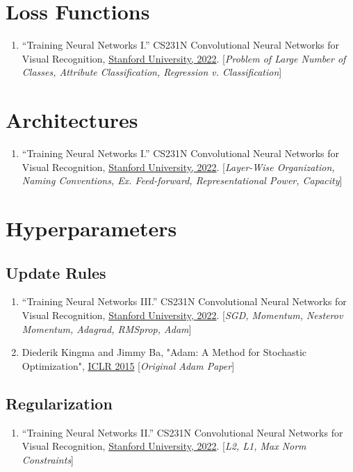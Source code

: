\documentclass[12pt]{article}
\begin{document}
\section{Loss Functions}
\begin{enumerate}
    \item “Training Neural Networks I.” 
    CS231N Convolutional Neural Networks for Visual Recognition, 
    \href{https://cs231n.github.io/neural-networks-2/#losses}{Stanford University, 2022}.
    [\emph{Problem of Large Number of Classes, Attribute Classification, 
    Regression v. Classification}]
\end{enumerate}

\section{Architectures}
\begin{enumerate}
    \item “Training Neural Networks I.” 
    CS231N Convolutional Neural Networks for Visual Recognition, 
    \href{https://cs231n.github.io/neural-networks-1/#nn}{Stanford University, 2022}.
    [\emph{Layer-Wise Organization, Naming Conventions, Ex. Feed-forward, 
    Representational Power, Capacity}]
\end{enumerate}

\section{Hyperparameters}
\subsection{Update Rules}
\begin{enumerate}
    \item “Training Neural Networks III.” 
    CS231N Convolutional Neural Networks for Visual Recognition, 
    \href{https://cs231n.github.io/neural-networks-3/#update}{Stanford University, 2022}. 
    [\emph{SGD, Momentum, Nesterov Momentum, Adagrad, RMSprop, Adam}]

    \item Diederik Kingma and Jimmy Ba, 
    "Adam: A Method for Stochastic Optimization", 
    \href{https://arxiv.org/abs/1412.6980}{ICLR 2015}
    [\emph{Original Adam Paper}]
\end{enumerate}

\subsection{Regularization}
\begin{enumerate}
    \item “Training Neural Networks II.” 
    CS231N Convolutional Neural Networks for Visual Recognition, 
    \href{https://cs231n.github.io/neural-networks-2/#reg}{Stanford University, 2022}. 
    [\emph{L2, L1, Max Norm Constraints}]
\end{enumerate}
\end{document}

